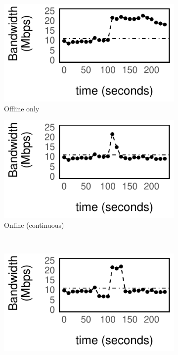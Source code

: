 \begin{figure}
  \centering
  \begin{subfigure}[t]{0.45\columnwidth}
    \centering
    \includegraphics[width=\textwidth]{figures/online1.pdf}
    \caption{Offline only}
    \label{fig:offline}
  \end{subfigure}
  \hfill
  \begin{subfigure}[t]{0.45\columnwidth}
    \centering
    \includegraphics[width=\textwidth]{figures/online2.pdf}
    \caption{Online (continuous)}
    \label{fig:online}
  \end{subfigure}
  \\
  \vspace{0.5em}
  \begin{subfigure}[t]{0.45\columnwidth}
    \includegraphics[width=\textwidth]{figures/online3.pdf}

\end{subfigure}
\end{figure}
